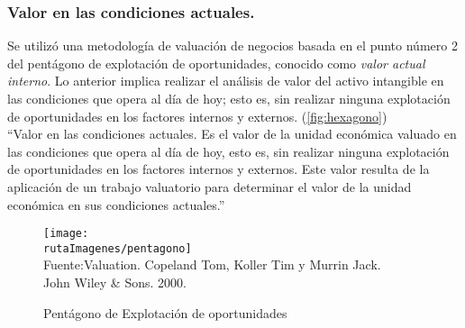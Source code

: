 \begin{rightcolumn}

\subsubsection{Valor en las condiciones actuales.}

Se utilizó una metodología de valuación de negocios basada en el punto número 2 del pentágono de explotación de oportunidades, conocido como \textit{valor actual interno}. Lo anterior  implica realizar el análisis de valor del activo intangible en las condiciones que opera al día de hoy; esto es, sin realizar ninguna explotación de oportunidades en los factores internos y externos. (\autoref{fig:hexagono})\\

``\textcolor{secundario}{Valor en las condiciones actuales.} Es el valor de la unidad econ\'omica valuado en las condiciones que opera al d\'ia de hoy, esto es, sin realizar ninguna explotaci\'on de oportunidades en los factores internos y externos. Este valor resulta de la aplicaci\'on de un trabajo valuatorio para determinar el valor de la unidad econ\'omica en sus condiciones actuales.'' \\



\end{rightcolumn}
\begin{leftcolumn}

\begin{figure}[H]
\centering
\caption{Pent\'agono de Explotaci\'on de oportunidades\label{fig:hexagono}}
\texttt{[image: \\rutaImagenes/pentagono]}\\
Fuente:Valuation. Copeland Tom, Koller Tim y Murrin Jack.\\

John Wiley \& Sons. 2000.
\end{figure}

\end{leftcolumn}





